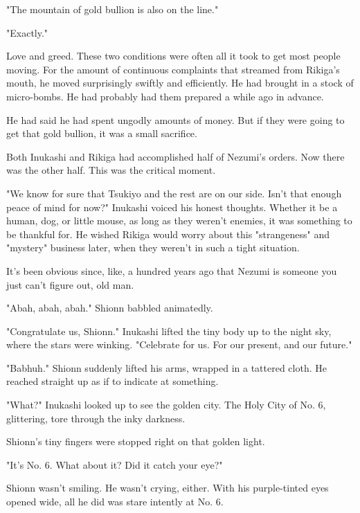 "The mountain of gold bullion is also on the line."

"Exactly."

Love and greed. These two conditions were often all it took to get most
people moving. For the amount of continuous complaints that streamed
from Rikiga's mouth, he moved surprisingly swiftly and efficiently. He
had brought in a stock of micro-bombs. He had probably had them prepared
a while ago in advance.

He had said he had spent ungodly amounts of money. But if they were
going to get that gold bullion, it was a small sacrifice.

Both Inukashi and Rikiga had accomplished half of Nezumi's orders. Now
there was the other half. This was the critical moment.

"We know for sure that Tsukiyo and the rest are on our side. Isn't that
enough peace of mind for now?" Inukashi voiced his honest thoughts.
Whether it be a human, dog, or little mouse, as long as they weren't
enemies, it was something to be thankful for. He wished Rikiga would
worry about this "strangeness" and "mystery" business later, when they
weren't in such a tight situation.

It's been obvious since, like, a hundred years ago that Nezumi is
someone you just can't figure out, old man.

"Abah, abah, abah." Shionn babbled animatedly.

"Congratulate us, Shionn." Inukashi lifted the tiny body up to the night
sky, where the stars were winking. "Celebrate for us. For our present,
and our future."

"Babhuh." Shionn suddenly lifted his arms, wrapped in a tattered cloth.
He reached straight up as if to indicate at something.

"What?" Inukashi looked up to see the golden city. The Holy City of No.
6, glittering, tore through the inky darkness.

Shionn's tiny fingers were stopped right on that golden light.

"It's No. 6. What about it? Did it catch your eye?"

Shionn wasn't smiling. He wasn't crying, either. With his purple-tinted
eyes opened wide, all he did was stare intently at No. 6.

\hypertarget{index_split_030.htmlux5cux23calibre_pb_54}{}

\protect\hypertarget{index_split_053.html}{}{}

\hypertarget{index_split_053.htmlux5cux23calibre_pb_0}{}

